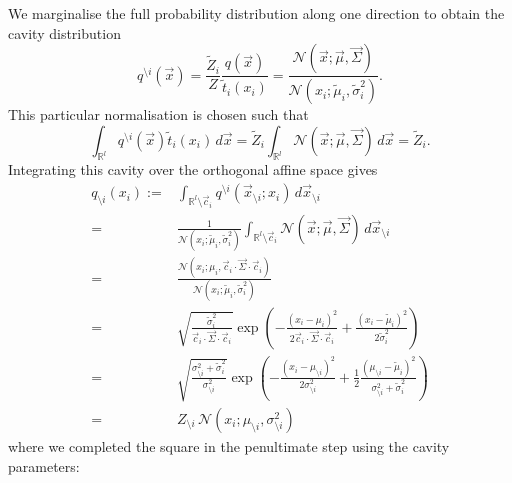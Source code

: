 \documentclass[11pt,twoside]{report}
\begin{document}
We marginalise the full probability distribution along one direction to obtain the cavity distribution
\begin{equation}
  q^{\setminus i}(\vec{x}) =
  \frac{\widetilde{Z}_i}{Z} \frac{q(\vec{x})}{\widetilde{t}_i(x_i)}
  =
  \frac
      {\mathcal{N}(\vec{x}; \vec{\mu}, \vec{\Sigma})}
      {\mathcal{N}(x_i; \widetilde{\mu}_i, \widetilde{\sigma}_i^2)}.
\end{equation}
This particular normalisation is chosen such that
\begin{equation}\label{eq:approximate-zeroth-moment}
  \int_{\mathbb{R}^l} q^{\setminus i}(\vec{x}) \widetilde{t}_i(x_i) \, d\vec{x} =
  \widetilde{Z}_i \int_{\mathbb{R}^l} \mathcal{N}(\vec{x}; \vec{\mu}, \vec{\Sigma}) \, d\vec{x} =
  \widetilde{Z}_i.
\end{equation}
Integrating this cavity over the orthogonal affine space gives
\begin{equation}
  \begin{split}
    q_{\setminus i}(x_i) :=&
    \int_{\mathbb{R}^l \setminus \vec{c}_i} q^{\setminus i} (\vec{x}_{\setminus i}; x_i) \, d\vec{x}_{\setminus i} \\
    =& \frac{1}{\mathcal{N}(x_i; \widetilde{\mu}_i, \widetilde{\sigma}_i^2)}
    \int_{\mathbb{R}^l \setminus \vec{c}_i} \mathcal{N}(\vec{x}; \vec{\mu}, \vec{\Sigma}) \, d\vec{x}_{\setminus i} \\
    =&
    \frac
        {\mathcal{N}(x_i; \mu_i, \vec{c}_i \cdot \vec{\Sigma} \cdot \vec{c}_i)}
        {\mathcal{N}(x_i; \widetilde{\mu}_i, \widetilde{\sigma}_i^2)} \\
    =&
        \sqrt{ \frac{\widetilde{\sigma}_i^2}{\vec{c}_i \cdot \vec{\Sigma} \cdot \vec{c}_i} }
        \exp{\left( -\frac{(x_i - \mu_i)^2}{2 \vec{c}_i \cdot \vec{\Sigma} \cdot \vec{c}_i} +
          \frac{(x_i - \widetilde{\mu}_i)^2}{2 \widetilde{\sigma}_i^2} \right)} \\
    =&
        \sqrt{ \frac{\sigma_{\setminus i}^2 + \widetilde{\sigma}_i^2}{\sigma_{\setminus i}^2} }
        \exp{\left(
          - \frac{(x_i - \mu_{\setminus i})^2}{2 \sigma_{\setminus i}^2}
          + \frac{1}{2}
          \frac{(\mu_{\setminus i} - \widetilde{\mu}_i)^2}{\sigma_{\setminus i}^2 + \widetilde{\sigma}_i^2}
          \right)} \\
     =& Z_{\setminus i} \, \mathcal{N}(x_i; \mu_{\setminus i}, \sigma_{\setminus i}^2)
  \end{split}
\end{equation}
where we completed the square in the penultimate step using the cavity parameters: \cite{Rasmussen2006,Cunningham2011}
\end{document}
